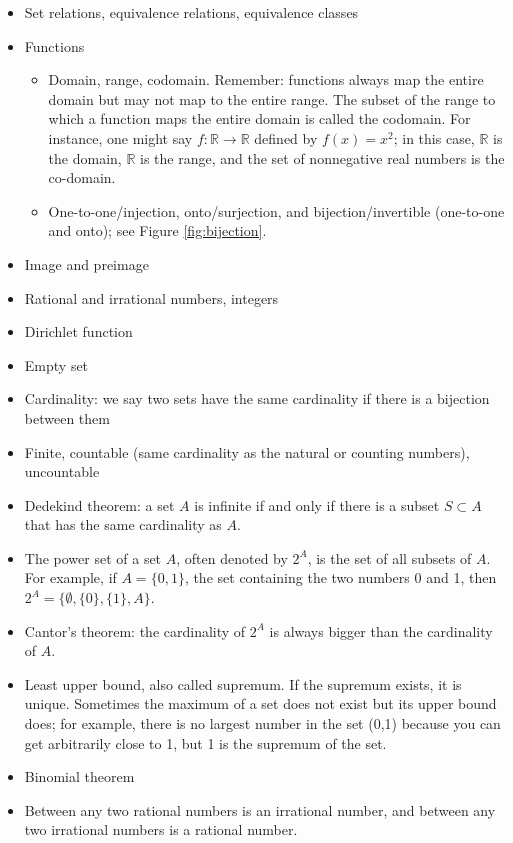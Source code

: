 \documentclass{article}
\begin{document}
\begin{itemize}
    \item Set relations, equivalence relations, equivalence classes
    \item Functions
    \begin{itemize}
        \item Domain, range, codomain. Remember: functions always map the entire domain but may not map to the entire range. The subset of the range to which a function maps the entire domain is called the codomain. For instance, one might say $f: \mathbb{R} \to \mathbb{R}$ defined by $f(x) = x^2$; in this case, $\mathbb{R}$ is the domain, $\mathbb{R}$ is the range, and the set of nonnegative real numbers is the co-domain.
        \item One-to-one/injection, onto/surjection, and bijection/invertible (one-to-one and onto); see Figure \ref{fig:bijection}.
    \end{itemize}
    \item Image and preimage
    \item Rational and irrational numbers, integers
    \item Dirichlet function
    \item Empty set
    \item Cardinality: we say two sets have the same cardinality if there is a bijection between them
    \item Finite, countable (same cardinality as the natural or counting numbers), uncountable
    \item Dedekind theorem: a set $A$ is infinite if and only if there is a subset $S\subset A$ that has the same cardinality as $A$.
    \item The power set of a set $A$, often denoted by $2^A$, is the set of all subsets of $A$.  For example, if $A = \{0, 1\}$, the set containing the two numbers 0 and 1, then $2^A = \{\emptyset, \{0\}, \{1\}, A\}$.
    \item Cantor's theorem: the cardinality of $2^A$ is always bigger than the cardinality of $A$.
    \item Least upper bound, also called supremum. If the supremum exists, it is unique. Sometimes the maximum of a set does not exist but its upper bound does; for example, there is no largest number in the set (0,1) because you can get arbitrarily close to 1, but 1 is the supremum of the set.
    \item Binomial theorem
    \item Between any two rational numbers is an irrational number, and between any two irrational numbers is a rational number.
\end{itemize}
\end{document}
